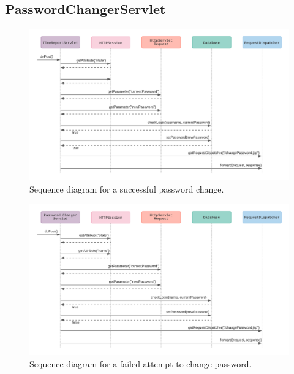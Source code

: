 \documentclass{article}
\begin{document}
\pagebreak
\subsection{PasswordChangerServlet}

\begin{figure}[h]
    \centering
    \includegraphics[scale=0.6]{images/successfulPasswordChange.png}
    \caption{Sequence diagram for a successful password change.}
    \label{fig:sucessfulPasswordChange}
\end{figure}

\begin{figure}[H]
    \centering
    \includegraphics[scale=0.6]{images/unsuccessfulPasswordChange.png}
    \caption{Sequence diagram for a failed attempt to change password.}
    \label{fig:failedPasswordChange}
\end{figure}
\end{document}
